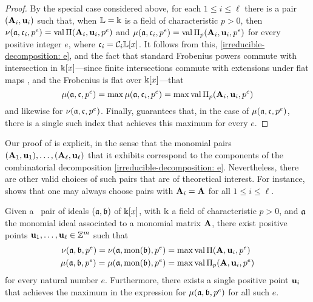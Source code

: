 \documentclass{article}
\begin{document}
\begin{proof}
By the special case considered above, for each $1\le i \le \ell$ there is a pair $(\mathbf{A}_i, \mathbf{u}_i)$ such that, when $\mathbb{L}=\Bbbk$ is a field of characteristic $p>0$, then $\nu(\mathfrak{a}, \mathfrak{c}_i, p^e) = \operatorname{val} \Pi(\mathbf{A}_i, \mathbf{u}_i, p^e)$ and $\mu(\mathfrak{a}, \mathfrak{c}_i, p^e) = \operatorname{val} \Pi_p(\mathbf{A}_i, \mathbf{u}_i, p^e)$ for every positive integer $e$, where $\mathfrak{c}_i = \mathcal{C}_i \mathbb{L}[x]$.    It follows from this, \eqref{irreducible-decomposition: e}, and the fact that standard Frobenius powers commute with intersection in $\Bbbk[x]$---since finite intersections commute with extensions under flat maps \cite[Theorem~7.4(ii)]{matsumura}, and the Frobenius is flat over $\Bbbk[x]$---that
\[ \mu(\mathfrak{a}, \mathfrak{c}, p^e) = \max  \mu(\mathfrak{a}, \mathfrak{c}_i, p^e)  = \max \operatorname{val} \Pi_p(\mathbf{A}_i, \mathbf{u}_i, p^e) \] and likewise for $\nu(\mathfrak{a}, \mathfrak{c}, p^e)$.  Finally,   guarantees that, in the case of $\mu(\mathfrak{a}, \mathfrak{c}, p^e)$, there is a single such index that achieves this maximum for every $e$.
\end{proof}

\begin{remark}
\label{lifting pairs: R}
{Our proof of}  is explicit, in the sense that the monomial pairs $(\mathbf{A}_1, \mathbf{u}_1), \ldots, (\mathbf{A}_{\ell}, \mathbf{u}_{\ell})$ that it exhibits correspond to the components of the combinatorial decomposition \eqref{irreducible-decomposition: e}.  Nevertheless, there are other valid choices of such pairs that are of theoretical interest.
For instance,   shows that one may always choose pairs with $\mathbf{A}_i=\mathbf{A}$ for all $1 \leq i \leq \ell$.
\end{remark}

\begin{theorem}%
   \label{reduce-to-monomial-case: T}
   Given a \compatible\ pair of ideals $(\mathfrak{a}, \mathfrak{b})$ of $\Bbbk[x]$, with $\Bbbk$ a field of characteristic $p>0$, and $\mathfrak{a}$ the monomial ideal associated to a monomial matrix $\mathbf{A}$, there exist positive points $\mathbf{u}_1, \ldots, \mathbf{u}_{\ell} \in \mathbb{Z}^m$ such that
\begin{align*} 
\nu(\mathfrak{a}, \mathfrak{b}, p^e) = \nu(\mathfrak{a}, \operatorname{mon}(\mathfrak{b}), p^e) & = \max \operatorname{val} \Pi(\mathbf{A},\mathbf{u}_i, p^e) \\ 
\mu(\mathfrak{a}, \mathfrak{b}, p^e) = \mu(\mathfrak{a}, \operatorname{mon}(\mathfrak{b}), p^e) & = \max \operatorname{val} \Pi_p(\mathbf{A},\mathbf{u}_i, p^e)
\end{align*}
%
for every natural number $e$.  Furthermore, there exists a single positive point $\mathbf{u}_i$ that achieves the maximum in the expression for $\mu(\mathfrak{a}, \mathfrak{b}, p^e)$ for all such $e$.
\end{theorem}
\end{document}
